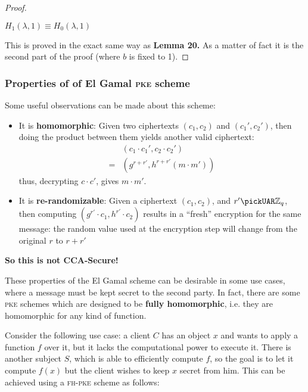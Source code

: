 \begin{proof}
    \begin{lemma}
        $H_1(\lambda,1)\equiv H_0(\lambda,1)$
    \end{lemma}
    This is proved in the exact same way as \textbf{Lemma 20.} As a matter of fact it is the second part of the proof (where $b$ is fixed to 1).
    
\end{proof}

\subsubsection{Properties of of El Gamal \textsc{pke} scheme}

Some useful observations can be made about this scheme:
\begin{itemize}
    \item It is \textbf{homomorphic}: Given two ciphertexts $(c_1, c_2)$ and $(c_1', c_2')$, then doing the product between them yields another valid ciphertext:
    \begin{align*}
        & (c_1\cdot c_1', c_2\cdot c_2') \\
        =& (g^{r+r'}, h^{r+r'}(m\cdot m'))
    \end{align*}
    thus, decrypting $c\cdot c'$, gives $m\cdot m'$.
    
    \item It is \textbf{re-randomizable}: Given a ciphertext $(c_1, c_2)$, and $r' \pickUAR \mathbb{Z}_q$, then computing $(g^{r'}\cdot c_1, h^{r'}\cdot c_2)$ results in a ``fresh'' encryption for the same message: the random value used at the encryption step will change from the original $r$ to $r+r'$
\end{itemize}
\textbf{So this is not CCA-Secure!}

These properties of the El Gamal scheme can be desirable in some use cases, where a message must be kept secret to the second party. In fact, there are some \textsc{pke} schemes which are designed to be \textbf{fully homomorphic}, i.e. they are homomorphic for any kind of function.

Consider the following use case: a client $C$ has an object $x$ and wants to apply a function $f$ over it, but it lacks the computational power to execute it. There is another subject $S$, which is able to efficiently compute $f$, so the goal is to let it compute $f(x)$ but the client wishes to keep $x$ secret from him. This can be achieved using a \textsc{fh-pke} scheme as follows:

